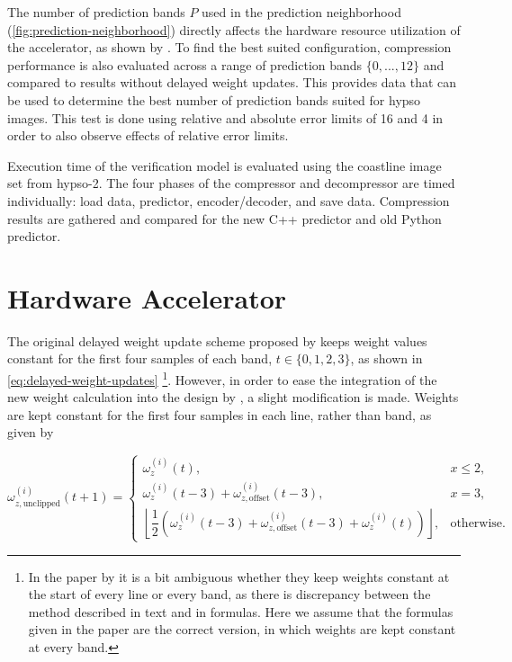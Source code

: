 The number of prediction bands $P$ used in the prediction neighborhood (\autoref{fig:prediction-neighborhood}) directly affects the hardware resource utilization of the accelerator, as shown by \citeauthor{vorhaugHyperspectralImageCompression2024} \cite{vorhaugHyperspectralImageCompression2024}. To find the best suited configuration, compression performance is also evaluated across a range of prediction bands $\{0,...,12\}$ and compared to results without delayed weight updates. This provides data that can be used to determine the best number of prediction bands suited for \acrshort{hypso} images. This test is done using relative and absolute error limits of 16 and 4 in order to also observe effects of relative error limits.

Execution time of the verification model is evaluated using the coastline image set from \acrshort{hypso}-2. The four phases of the compressor and decompressor are timed individually: load data, predictor, encoder/decoder, and save data. Compression results are gathered and compared for the new C++ predictor and old Python predictor.

\section{Hardware Accelerator}

The original delayed weight update scheme proposed by \citeauthor{jiaRemovalFeedbackLoop2025} keeps weight values constant for the first four samples of each band, $t \in \{0,1,2,3\}$, as shown in \autoref{eq:delayed-weight-updates} \footnote{In the paper by \citeauthor{jiaRemovalFeedbackLoop2025} it is a bit ambiguous whether they keep weights constant at the start of every line or every band, as there is discrepancy between the method described in text and in formulas. Here we assume that the formulas given in the paper are the correct version, in which weights are kept constant at every band.}. However, in order to ease the integration of the new weight calculation into the design by \citeauthor{vorhaugHyperspectralImageCompression2024}, a slight modification is made. Weights are kept constant for the first four samples in each line, rather than band, as given by

\begin{equation}
	\omega^{(i)}_{z, \text{unclipped}}(t+1)=
	\begin{cases}
		\omega^{(i)}_z(t),                                                                                                                   & x \le 2,          \\[6pt]
		\omega^{(i)}_z(t-3) + \omega^{(i)}_{z, \text{offset}}(t-3),                                                                          & x = 3,            \\[6pt]
		\left\lfloor \dfrac{1}{2}\left(\omega^{(i)}_z(t-3) + \omega^{(i)}_{z, \text{offset}}(t-3) + \omega^{(i)}_z(t) \right) \right\rfloor, & \text{otherwise}.
	\end{cases}
	\label{eq:delayed-weight-updates-modified}
\end{equation}

